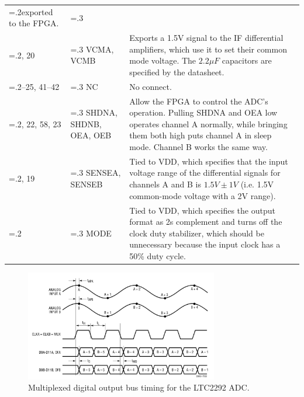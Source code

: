 \begin{tabularx}{\textwidth}{>{\hsize=.2\hsize}X >{\hsize=.3\hsize}X X}
        exported to the FPGA\@.                                                                \\
        61, 20             & VCMA, VCMB                 & Exports a 1.5V signal to the IF differential amplifiers, which use it
        to set their common mode voltage. The $2.2 \si{\mu F}$ capacitors are specified by the
        datasheet.                                                                             \\
        24--25, 41--42     & NC                         & No connect.                          \\
        59, 22, 58, 23     & SHDNA, SHDNB, OEA, OEB     & Allow the FPGA to control the ADC's
        operation. Pulling SHDNA and OEA low operates channel A normally, while bringing them both
        high puts channel A in sleep mode. Channel B works the same way.                       \\
        62, 19             & SENSEA, SENSEB             & Tied to VDD, which specifies that the input voltage range of the
        differential signals for channels A and B is $1.5 \si{V} \pm 1
        \si{V}$ (i.e. 1.5V common-mode voltage with a 2V range).                               \\
        60                 & MODE                       & Tied to VDD, which specifies the output
        format as 2s complement and turns off the clock duty stabilizer, which should be unnecessary
        because the input clock has a 50\% duty cycle.                                         \\

        \bottomrule
\end{tabularx}

\begin{figure}[h]
        \centering\includegraphics[width=0.75\textwidth]{data/LTC2292-multiplex.png}
        \caption{Multiplexed digital output bus timing for the LTC2292 ADC.}
        \label{fig:ltc2292-multiplex}
\end{figure}

